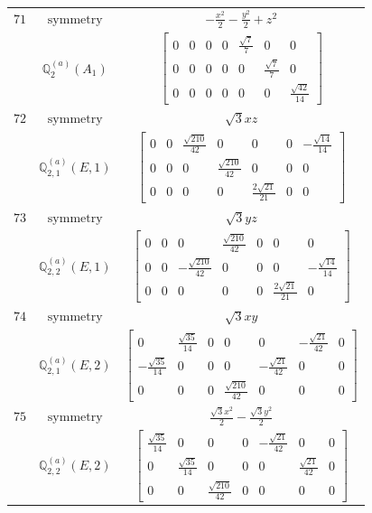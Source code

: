 \documentclass[fleqn,8pt,landscape]{jsarticle}
\begin{document}
\begin{longtable}{ccc}
$ 71 $ & $ \text{symmetry} $ & $ - \frac{x^{2}}{2} - \frac{y^{2}}{2} + z^{2} $ \\
$  $ & $ \mathbb{Q}_{2}^{(a)}(A_{1}) $ & $ \begin{bmatrix} 0 & 0 & 0 & 0 & \frac{\sqrt{7}}{7} & 0 & 0 \\ 0 & 0 & 0 & 0 & 0 & \frac{\sqrt{7}}{7} & 0 \\ 0 & 0 & 0 & 0 & 0 & 0 & \frac{\sqrt{42}}{14} \end{bmatrix} $ \\ \hline
$ 72 $ & $ \text{symmetry} $ & $ \sqrt{3} x z $ \\
$  $ & $ \mathbb{Q}_{2,1}^{(a)}(E,1) $ & $ \begin{bmatrix} 0 & 0 & \frac{\sqrt{210}}{42} & 0 & 0 & 0 & - \frac{\sqrt{14}}{14} \\ 0 & 0 & 0 & \frac{\sqrt{210}}{42} & 0 & 0 & 0 \\ 0 & 0 & 0 & 0 & \frac{2 \sqrt{21}}{21} & 0 & 0 \end{bmatrix} $ \\ \hline
$ 73 $ & $ \text{symmetry} $ & $ \sqrt{3} y z $ \\
$  $ & $ \mathbb{Q}_{2,2}^{(a)}(E,1) $ & $ \begin{bmatrix} 0 & 0 & 0 & \frac{\sqrt{210}}{42} & 0 & 0 & 0 \\ 0 & 0 & - \frac{\sqrt{210}}{42} & 0 & 0 & 0 & - \frac{\sqrt{14}}{14} \\ 0 & 0 & 0 & 0 & 0 & \frac{2 \sqrt{21}}{21} & 0 \end{bmatrix} $ \\ \hline
$ 74 $ & $ \text{symmetry} $ & $ \sqrt{3} x y $ \\
$  $ & $ \mathbb{Q}_{2,1}^{(a)}(E,2) $ & $ \begin{bmatrix} 0 & \frac{\sqrt{35}}{14} & 0 & 0 & 0 & - \frac{\sqrt{21}}{42} & 0 \\ - \frac{\sqrt{35}}{14} & 0 & 0 & 0 & - \frac{\sqrt{21}}{42} & 0 & 0 \\ 0 & 0 & 0 & \frac{\sqrt{210}}{42} & 0 & 0 & 0 \end{bmatrix} $ \\ \hline
$ 75 $ & $ \text{symmetry} $ & $ \frac{\sqrt{3} x^{2}}{2} - \frac{\sqrt{3} y^{2}}{2} $ \\
$  $ & $ \mathbb{Q}_{2,2}^{(a)}(E,2) $ & $ \begin{bmatrix} \frac{\sqrt{35}}{14} & 0 & 0 & 0 & - \frac{\sqrt{21}}{42} & 0 & 0 \\ 0 & \frac{\sqrt{35}}{14} & 0 & 0 & 0 & \frac{\sqrt{21}}{42} & 0 \\ 0 & 0 & \frac{\sqrt{210}}{42} & 0 & 0 & 0 & 0 \end{bmatrix} $ \\ \hline

\end{longtable}
\end{document}
